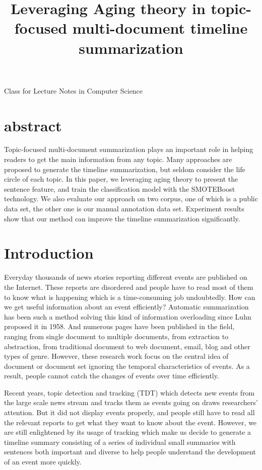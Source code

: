 \documentclass{llncs}
\begin{document}
{\LaTeXe{} Class for Lecture Notes in Computer Science}
\thispagestyle{empty}
\vspace{2pt}
\vfill

%
\title {Leveraging  Aging theory in topic-focused multi-document timeline summarization} 
\maketitle
%
\section{abstract}

Topic-focused multi-document summarization plays an important role in helping readers to get the main information from any topic. Many approaches are proposed to generate the timeline summarization, but seldom consider the life circle of each topic. In this paper, we leveraging aging theory to present the sentence feature, and train the classification model with the SMOTEBoost technology. We also evaluate our approach on two corpus, one of which is a public data set, the other one is our manual annotation data set. Experiment results show that our method can improve the timeline summarization significantly. 


%
\section{Introduction}
%


Everyday thousands of news stories reporting different events are published on the Internet. These reports are disordered and people have to read most of them to know what is happening which is a time-consuming job undoubtedly. How can we get useful information about an event efficiently? Automatic summarization has been such a method solving this kind of information overloading since Luhn \cite{1958-Luhn-p159-165} proposed it in 1958. And numerous pages have been published in the field, ranging from single document to multiple documents, from extraction to abstraction, from traditional document to web document, email, blog and other types of genre. However, these research work focus on the central idea of document or document set ignoring the temporal characteristics of events. As a result, people cannot catch the changes of events over time efficiently. 

Recent years, topic detection and tracking (TDT) which detects new events from the large scale news stream and tracks them as events going on draws researchers' attention. But it did not display events properly, and people still have to read all the relevant reports to get what they want to know about the event. However, we are still enlightened by its usage of tracking which make us decide to generate a timeline summary consisting of a series of individual small summaries with sentences both important and diverse to help people understand the development of an event more quickly.
\end{document}
